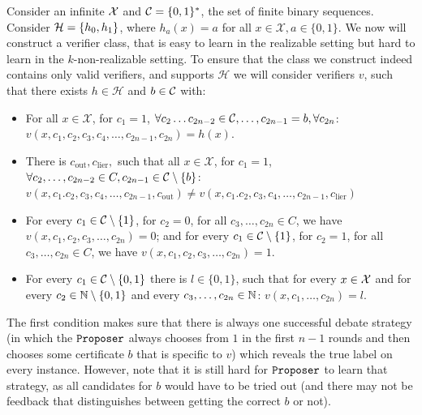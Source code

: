 \documentclass[11pt,letterpaper]{article}
\theoremstyle{definition}
\theoremstyle{plain}
\begin{document}
    Consider an infinite ${\mathcal X}$ and ${{\mathcal C}} = \{0,1\}^*$, the set of finite binary sequences.  Consider ${{\mathcal H}} = \{h_0,h_1\}$, where $h_a(x) = a$ for all $x\in \mathcal{X}, a\in\{0,1\}$. 
    We now will construct a verifier class, that is easy to learn in the realizable setting but hard to learn in the $k$-non-realizable setting.
  To ensure that the class we construct indeed contains only valid  verifiers, and supports $\mathcal{H}$ we will consider verifiers $v$, such that there exists $h\in \mathcal{H}$ and $b\in {{\mathcal C}}$ with:
  \begin{itemize}
      \item For all $x \in \mathcal{X}$, for $c_1 =1$, $\forall c_2 \dots c_{2n-2}\in {{\mathcal C}}, \dots, c_{2n-1}= b, \forall c_{2n}  $: $v(x, c_1, c_2, c_3,c_4, \dots, c_{2n-1}, c_{2n}) = h(x) $.
      \item There is $c_{\mathrm{out}},c_{\mathrm{lier}}, $ such that all $x \in \mathcal{X}$, for $c_1 =1$, $\forall c_2, \dots, c_{2n-2} \in C,  c_{2n-1} \in {{\mathcal C}} \setminus \{b\}$: $v(x, c_1. c_2, c_3,c_4, \dots, c_{2n-1}, c_{\mathrm{out}}) \neq v(x, c_1. c_2, c_3,c_4, \dots, c_{2n-1}, c_{\mathrm{lier}}) $%
      \item For every $c_1 \in {{\mathcal C}} \setminus \{1\}$, for $c_2 = 0 $, for all $c_3, \dots, c_{2n} \in C$, we have $v(x,c_1, c_2, c_3, \dots, c_{2n}) = 0$; and for every $c_1 \in {{\mathcal C}} \setminus \{1\}$, for $c_2 = 1 $, for all $c_3, \dots, c_{2n} \in C$, we have $v(x,c_1, c_2, c_3, \dots, c_{2n}) = 1$. 
      \item For every $c_1\in {{\mathcal C}} \setminus \{0,1\}$ there is $l \in \{0,1\}$, such that for every $x\in{\mathcal X}$ and for every $c_2\in \mathbb{N} \setminus \{0,1\}$ and every $c_3, \dots, c_{2n} \in \mathbb{N}$: $v(x,c_1, \dots, c_{2n})= l $.
  \end{itemize}
    The first condition makes sure that there is always one successful debate strategy (in which the $\texttt{Proposer}$ always chooses from $1$ in the first $n-1$ rounds and then chooses some certificate $b$ that is specific to $v$) which reveals the true label on every instance. 
    However, note that it is still hard for $\texttt{Proposer}$ to learn that strategy, as all candidates for $b$ would have to be tried out (and there may not be feedback that distinguishes between getting the correct $b$ or not). 
    
\end{document}
